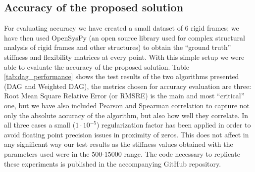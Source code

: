 \subsection{Accuracy of the proposed solution}

For evaluating accuracy we have created a small dataset of 6 rigid frames; we have then used OpenSysPy \cite{ZHU20186} 
(an open source library used for complex structural analysis of rigid frames and other structures)
to obtain the ``ground truth'' stiffness and flexibility matrices at every point.
With this simple setup we were able to evaluate the accuracy of the proposed solution.
Table \ref{tab:dag_performance} shows the test results of the two algorithms presented (DAG and Weighted DAG),
the metrics chosen for accuracy evaluation are three: Root Mean Square Relative Error (or RMSRE)
is the main and most ``critical'' one, but we have also included Pearson and Spearman correlation
to capture not only the absolute accuracy of the algorithm, but also how well they correlate.
In all three cases a small ($1 \cdot 10^{-5}$) regularization factor has been applied in order to avoid
floating point precision issues in proximity of zeros. This does not affect in any significant way our test results
as the stiffness values obtained with the parameters used were in the 500-15000 range.
The code necessary to replicate these experiments is published in the accompanying
GitHub repository.



